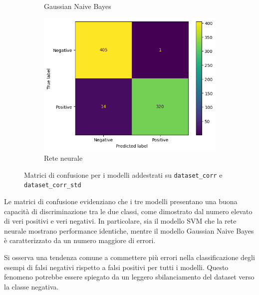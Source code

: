 \begin{figure}[!ht]
\begin{subfigure}{.3\textwidth}
        \caption{Gaussian Naive Bayes}
        \label{fig:matrice_di_confusione_per_GNB_corr}
    \end{subfigure}
    \hfill
    \begin{subfigure}{.3\textwidth}
        \centering
        \includegraphics[width=\textwidth]{img/rete/matrice_confusione.png}
        \caption{Rete neurale}
        \label{fig:matrice_di_confusione_per_NN_corr}
    \end{subfigure}
    \caption{Matrici di confusione per i modelli addestrati su \texttt{dataset\_corr} e \texttt{dataset\_corr\_std}}
    \label{fig:matrice_di_confusione_per_corr}
\end{figure}

Le matrici di confusione evidenziano che i tre modelli presentano una buona
capacità di discriminazione tra le due classi, come dimostrato dal numero
elevato di veri positivi e veri negativi. In particolare, sia il modello SVM che
la rete neurale mostrano performance identiche, mentre il modello Gaussian Naive
Bayes è caratterizzato da un numero maggiore di errori.

Si osserva una tendenza comune a commettere più errori nella classificazione
degli esempi di falsi negativi rispetto a falsi positivi per tutti i modelli.
Questo fenomeno potrebbe essere spiegato da un leggero sbilanciamento del dataset
verso la classe negativa.

